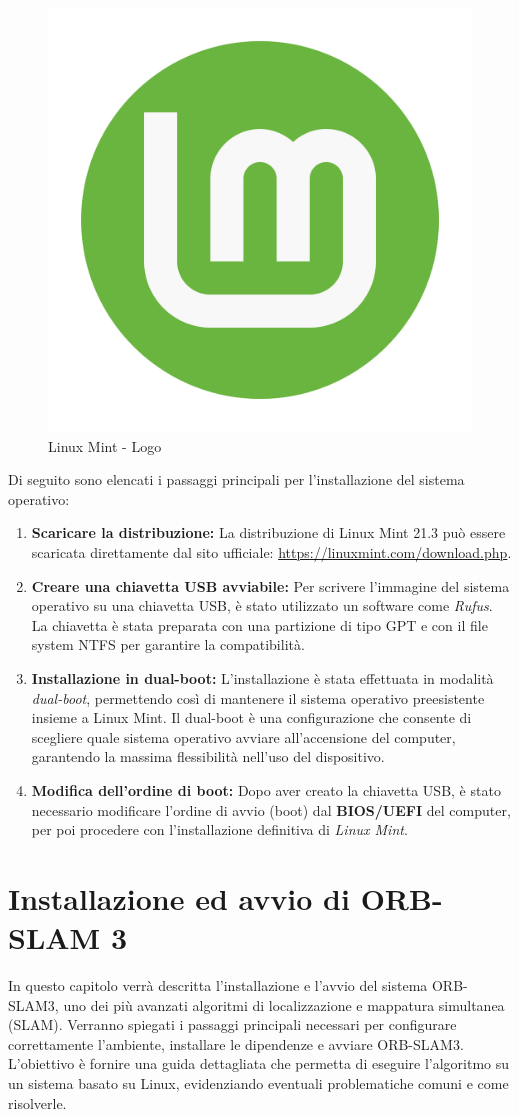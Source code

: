 \documentclass[12pt,a4paper]{report}
\begin{document}
\begin{figure}[h]
    \centering
    \includegraphics[width=0.2\linewidth]{img/mint_logo.png}
    \caption{Linux Mint - Logo}
\end{figure}

Di seguito sono elencati i passaggi principali per l'installazione del sistema operativo:

\begin{enumerate}
    \item \textbf{Scaricare la distribuzione:} La distribuzione di Linux Mint 21.3 può essere scaricata direttamente dal sito ufficiale: \url{https://linuxmint.com/download.php}.
    \item \textbf{Creare una chiavetta USB avviabile:} Per scrivere l'immagine del sistema operativo su una chiavetta USB, è stato utilizzato un software come \textit{Rufus}. La chiavetta è stata preparata con una partizione di tipo GPT e con il file system NTFS per garantire la compatibilità.
    \item \textbf{Installazione in dual-boot:} L'installazione è stata effettuata in modalità \textit{dual-boot}, permettendo così di mantenere il sistema operativo preesistente insieme a Linux Mint. Il dual-boot è una configurazione che consente di scegliere quale sistema operativo avviare all'accensione del computer, garantendo la massima flessibilità nell'uso del dispositivo.
    \item \textbf{Modifica dell'ordine di boot:} Dopo aver creato la chiavetta USB, è stato necessario modificare l'ordine di avvio (boot) dal \textbf{BIOS/UEFI }del computer, per poi procedere con l'installazione definitiva di \textit{Linux Mint}.
\end{enumerate}


\section{Installazione ed avvio di ORB-SLAM 3}

In questo capitolo verrà descritta l'installazione e l'avvio del sistema ORB-SLAM3, uno dei più avanzati algoritmi di localizzazione e mappatura simultanea (SLAM). Verranno spiegati i passaggi principali necessari per configurare correttamente l'ambiente, installare le dipendenze e avviare ORB-SLAM3. L'obiettivo è fornire una guida dettagliata che permetta di eseguire l'algoritmo su un sistema basato su Linux, evidenziando eventuali problematiche comuni e come risolverle.
\end{document}
